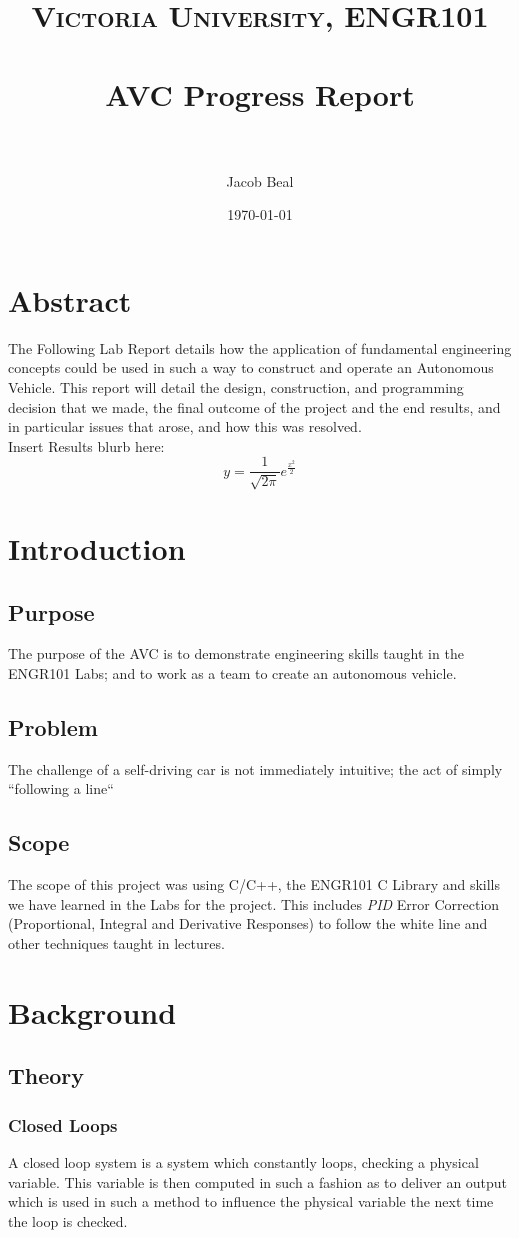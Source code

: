 \documentclass[paper=a4, fontsize=11pt]{scrartcl} %
\title{
\normalfont \normalsize
\textsc{Victoria University, ENGR101} \\ [25pt] %
\horrule{0.5pt} \\[0.4cm] %
\huge AVC Progress Report\\ %
\horrule{2pt} \\[0.5cm] %
}
\author{Jacob Beal} %
\date{\normalsize\today} %
\numberwithin{equation}{section} %
\numberwithin{figure}{section} %
\begin{document}
\maketitle
\tableofcontents
\section{Abstract}
The Following Lab Report details how the application of fundamental engineering
concepts could be used in such a way to construct and operate an Autonomous
Vehicle. This report will detail the design, construction, and programming
decision that we made, the final outcome of the project and the end results,
and in particular issues that arose, and how this was resolved.\\

Insert Results blurb here:\\
$$y=\frac{1}{\sqrt{2\pi}}e^{\frac{x^2}{2}}$$
\section{Introduction}
\subsection{Purpose}
The purpose of the AVC is to demonstrate engineering skills taught in the
ENGR101 Labs; and to work as a team to create an autonomous vehicle.
\subsection{Problem}
The challenge of a self-driving car is not immediately intuitive; the act of
simply ``following a line``
\subsection{Scope}
The scope of this project was using C/C++, the ENGR101 C Library and skills we
have learned in the Labs for the project. This includes \textit{PID} Error
Correction (Proportional, Integral and Derivative Responses) to follow the 
white line and other techniques taught in lectures.

\section{Background}
\subsection{Theory}
\subsubsection{Closed Loops}
A closed loop system is a system which constantly loops, checking a physical
variable. This variable is then computed in such a fashion as to deliver an
output which is used in such a method to influence the physical variable the
next time the loop is checked.\cite{elfClosedLoops}
\end{document}
